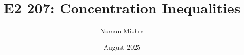 \documentclass[12pt]{report}
\title{E2 207: Concentration Inequalities}
\author{Naman Mishra}
\date{August 2025}
\begin{document}
\maketitle
\tableofcontents
\listoflecture
    
    
\end{document}
